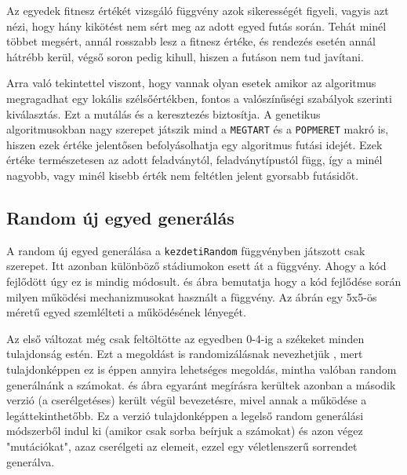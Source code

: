\documentclass[12pt,a4paper,oneside]{report}
\begin{document}
	Az egyedek fitnesz értékét vizsgáló függvény azok sikerességét figyeli, vagyis azt nézi, hogy hány kikötést nem sért meg az adott egyed futás során. Tehát minél többet megsért, annál rosszabb lesz a fitnesz értéke, és rendezés esetén annál hátrébb kerül, végső soron pedig kihull, hiszen a futáson nem tud javítani.
	
	Arra való tekintettel viszont, hogy vannak olyan esetek amikor az algoritmus megragadhat egy lokális szélsőértékben, fontos a valószínűségi szabályok szerinti kiválasztás. Ezt a mutálás és a keresztezés biztosítja.
A genetikus algoritmusokban nagy szerepet játszik mind a \texttt{MEGTART} és a \texttt{POPMERET} makró is, hiszen ezek értéke jelentősen befolyásolhatja egy algoritmus futási idejét. Ezek értéke természetesen az adott feladványtól, feladványtípustól függ, így a minél nagyobb, vagy minél kisebb érték nem feltétlen jelent gyorsabb futásidőt.


        
        \subsection{Random új egyed generálás} %
        
        A random új egyed generálása a \texttt{kezdetiRandom} függvényben játszott csak szerepet.
        Itt azonban különböző stádiumokon esett át a függvény. Ahogy a kód fejlődött úgy ez is mindig módosult.
         és  ábra bemutatja hogy a kód fejlődése során milyen működési mechanizmusokat használt a függvény.
        Az ábrán egy 5x5-ös méretű egyed szemlélteti a működésének lényegét.
        
        
        Az első változat még csak feltöltötte az egyedben 0-4-ig a székeket minden tulajdonság estén.
        Ezt a megoldást is randomizálásnak nevezhetjük , mert tulajdonképpen ez is éppen annyira lehetséges megoldás, mintha valóban random generálnánk a számokat.
         és  ábra egyaránt megírásra kerültek azonban a második verzió (a cserélgetéses) került végül bevezetésre, mivel annak a működése a legáttekinthetőbb.
        Ez a verzió tulajdonképpen a legelső random generálási módszerből indul ki (amikor csak sorba beírjuk a számokat) és azon végez "mutációkat", azaz cserélgeti az elemeit, ezzel egy véletlenszerű sorrendet generálva.
        
\end{document}
